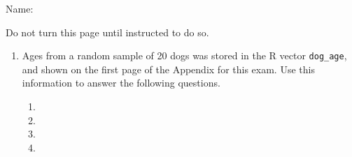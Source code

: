 \documentclass{article}\usepackage[]{graphicx}\usepackage[]{color}
\newcommand{\R}[1]{\texttt{#1}}
\begin{document}
{\vspace{2cm}


\hspace{1cm} {\Huge Name:} \underline{\hspace{10cm}}



\vspace{3cm}
\hspace{2cm} {\Large Do not turn this page until instructed to do so.}

\newpage
}


\begin{enumerate}
\item Ages from a random sample of 20 dogs was stored in the R vector
  \R{dog\_age}, and shown on the first page of the Appendix for this
  exam. Use this information to answer the following questions.
  \begin{enumerate}
    \item {} \vspace{3cm}
    \item {} \vspace{3cm}
    \item {} \vspace{3cm}
    \item {} \vspace{3cm}
  \end{enumerate}

\newpage



\end{enumerate}
\end{document}
